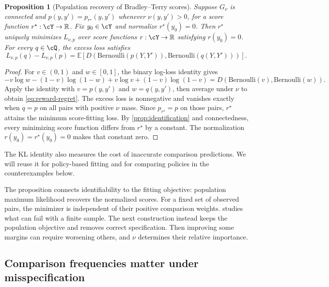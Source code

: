 \documentclass[11pt,twoside]{article}
\newcommand{\E}{\mathbb E}
\newcommand{\R}{\mathbb R}
\newcommand{\KL}{D}
\newtheorem{proposition}[theorem]{Proposition}
\theoremstyle{definition}
\theoremstyle{remark}
\begin{document}
\begin{proposition}[Population recovery of Bradley--Terry scores]
\label{prop:population-recovery}
Suppose $G_\nu$ is connected and
$p(y,y')=p_{r^\star}(y,y')$ whenever $\nu(y,y')>0$, for a score function
$r^\star:\cY\to\R$. Fix $y_0\in\cY$ and normalize
$r^\star(y_0)=0$. Then $r^\star$ uniquely minimizes
$L_{\nu,p}$ over score functions $r:\cY\to\R$ satisfying
$r(y_0)=0$. For every $q\in\cQ$, the excess loss satisfies
\begin{equation}
 L_{\nu,p}(q)-L_{\nu,p}(p)
 =\E\!\left[\KL\!\left(\mathrm{Bernoulli}(p(Y,Y')),
                         \mathrm{Bernoulli}(q(Y,Y'))\right)\right].
 \label{eq:reward-regret}
\end{equation}
\end{proposition}

\begin{proof}
For $v\in(0,1)$ and $w\in[0,1]$, the binary log-loss identity gives
\[
 -v\log w-(1-v)\log(1-w)+v\log v+(1-v)\log(1-v)
 =\KL\!\left(\mathrm{Bernoulli}(v),\mathrm{Bernoulli}(w)\right).
\]
Apply the identity with $v=p(y,y')$ and $w=q(y,y')$, then average under
$\nu$ to obtain \cref{eq:reward-regret}. The excess loss is nonnegative
and vanishes exactly when $q=p$ on all pairs with positive $\nu$ mass.
Since $p_{r^\star}=p$ on those pairs, $r^\star$ attains the minimum
score-fitting loss. By \cref{prop:identification} and connectedness,
every minimizing score function differs from $r^\star$ by a constant.
The normalization $r(y_0)=r^\star(y_0)=0$ makes that constant zero.
\end{proof}

The KL identity also measures the cost of inaccurate comparison predictions.
We will reuse it for policy-based fitting and for comparing policies in the
counterexamples below.

The proposition connects identifiability to the fitting objective: population
maximum likelihood recovers the normalized scores. For a fixed set of
observed pairs, the minimizer is independent of their positive comparison
weights.  studies what can fail with a finite
sample. The next construction instead keeps the population objective and
removes correct specification. Then improving some margins can require
worsening others, and $\nu$ determines their relative importance.

\subsection{Comparison frequencies matter under misspecification}
\end{document}
